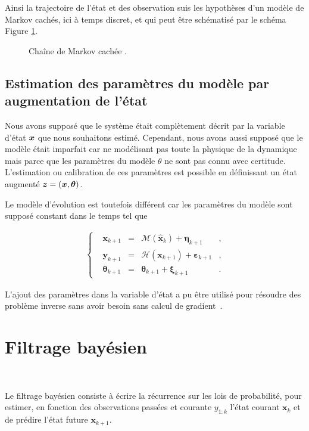 Ainsi la trajectoire de l'état et des observation suis les hypothèses d'un modèle de Markov cachés, ici à temps discret, et qui peut être schématisé par le schéma Figure \ref{fig:hidden_markov}.

\begin{figure}[h]
    \centering
    \caption{Chaîne de Markov cachée .}
    \label{fig:hidden_markov}
\end{figure}

\subsection{Estimation des paramètres du modèle par augmentation de l'état}
Nous avons supposé que le système était complètement décrit par la variable d'état $\bm{x}$ que nous souhaitons estimé. Cependant, nous avons aussi supposé que le modèle était imparfait car ne modélisant pas toute la physique de la dynamique mais parce que les paramètres du modèle $\theta$ ne sont pas connu avec certitude. L'estimation ou calibration de ces paramètres est possible en définissant un état augmenté $\bm z = (\bm{x}, \bm \theta)$.

Le modèle d'évolution est toutefois différent car les paramètres du modèle sont supposé constant dans le temps tel que

\begin{gather*}
    \left\{\begin{aligned}
         & \bm{x}_{k+1}      & = & \mathcal{M}(\hat{\bm{x}}_{k}) + \bm{\eta}_{k+1}    & , \\
         & \bm{y}_{k+1}      & = & \mathcal{H}(\bm{x}_{k+1}) + \bm{\varepsilon}_{k+1} & , \\
         & \bm{\theta}_{k+1} & = & \bm{\theta}_{k+1} + \bm{\xi}_{k+1}                 & .
    \end{aligned} \right.
\end{gather*}

L'ajout des paramètres dans la variable d'état a pu être utilisé pour résoudre des problème inverse sans avoir besoin sans calcul de gradient~\cite{iglesias_ensemble_2013}.

\section{Filtrage bayésien}~\label{filtrage_bayesien}

Le filtrage bayésien consiste à écrire la récurrence sur les lois de probabilité, pour estimer, en fonction des observations passées et courante $y_{1:k}$ l'état courant $\bm x_k$ et de prédire l'état future $\bm x_{k+1}$.

